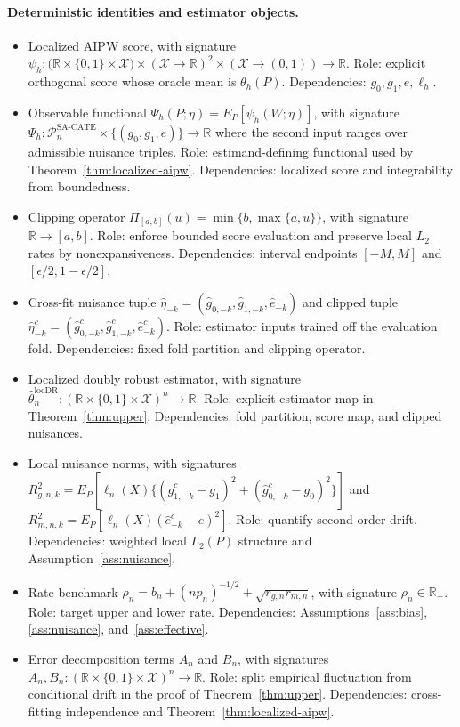 \documentclass[11pt]{article}
\theoremstyle{definition}
\theoremstyle{plain}
\theoremstyle{remark}
\begin{document}
\paragraph{Deterministic identities and estimator objects.}
\begin{itemize}[leftmargin=*]
  \item Localized AIPW score, with signature $\psi_h:\bigl(\mathbb{R}\times\{0,1\}\times\mathcal{X}\bigr)\times(\mathcal{X}\to\mathbb{R})^2\times(\mathcal{X}\to(0,1))\to\mathbb{R}$. Role: explicit orthogonal score whose oracle mean is $\theta_h(P)$. Dependencies: $g_0,g_1,e,\ell_h$.
  \item Observable functional $\Psi_h(P;\eta)=E_P[\psi_h(W;\eta)]$, with signature $\Psi_h:\mathcal{P}_n^{\mathrm{SA\text{-}CATE}}\times\{(g_0,g_1,e)\}\to\mathbb{R}$ where the second input ranges over admissible nuisance triples. Role: estimand-defining functional used by Theorem~\ref{thm:localized-aipw}. Dependencies: localized score and integrability from boundedness.
  \item Clipping operator $\Pi_{[a,b]}(u)=\min\{b,\max\{a,u\}\}$, with signature $\mathbb{R}\to[a,b]$. Role: enforce bounded score evaluation and preserve local $L_2$ rates by nonexpansiveness. Dependencies: interval endpoints $[-M,M]$ and $[\epsilon/2,1-\epsilon/2]$.
  \item Cross-fit nuisance tuple $\hat\eta_{-k}=(\hat g_{0,-k},\hat g_{1,-k},\hat e_{-k})$ and clipped tuple $\hat\eta^c_{-k}=(\hat g^c_{0,-k},\hat g^c_{1,-k},\hat e^c_{-k})$. Role: estimator inputs trained off the evaluation fold. Dependencies: fixed fold partition and clipping operator.
  \item Localized doubly robust estimator, with signature $\hat\theta_n^{\mathrm{locDR}}:(\mathbb{R}\times\{0,1\}\times\mathcal{X})^n\to\mathbb{R}$. Role: explicit estimator map in Theorem~\ref{thm:upper}. Dependencies: fold partition, score map, and clipped nuisances.
  \item Local nuisance norms, with signatures $R_{g,n,k}^2=E_P[\ell_n(X)\{(\hat g^c_{1,-k}-g_1)^2+(\hat g^c_{0,-k}-g_0)^2\}]$ and $R_{m,n,k}^2=E_P[\ell_n(X)(\hat e^c_{-k}-e)^2]$. Role: quantify second-order drift. Dependencies: weighted local $L_2(P)$ structure and Assumption~\ref{ass:nuisance}.
  \item Rate benchmark $\rho_n=b_n+(n p_n)^{-1/2}+\sqrt{r_{g,n}r_{m,n}}$, with signature $\rho_n\in\mathbb{R}_+$. Role: target upper and lower rate. Dependencies: Assumptions~\ref{ass:bias}, \ref{ass:nuisance}, and~\ref{ass:effective}.
  \item Error decomposition terms $A_n$ and $B_n$, with signatures $A_n,B_n:(\mathbb{R}\times\{0,1\}\times\mathcal{X})^n\to\mathbb{R}$. Role: split empirical fluctuation from conditional drift in the proof of Theorem~\ref{thm:upper}. Dependencies: cross-fitting independence and Theorem~\ref{thm:localized-aipw}.
\end{itemize}
\end{document}
